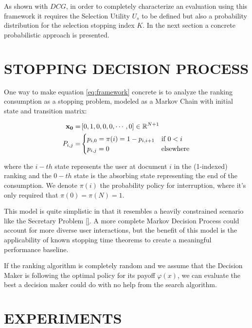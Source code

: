 \documentclass[a4paper, 10pt, conference]{ieeeconf}
\begin{document}
As shown with $DCG$, in order to completely characterize an evaluation using
this framework it requires the Selection Utility $U_s$ to be defined but also a
probability distribution for the selection stopping index $K$. In the next
section a concrete probabilistic approach is presented.


\section{STOPPING DECISION PROCESS}
\label{sec:stopping}

One way to make equation \ref{eq:framework} concrete is to analyze the ranking
consumption as a stopping problem, modeled as a Markov Chain with initial state
and transition matrix:

\begin{equation}
\begin{aligned}
\bf{x}_0 =& \left[0,1,0,0,0,\cdots,0\right] \in \mathbb{R}^{N+1}\\
P_{i,j} =& \begin{cases}
p_{i, 0} = \pi(i) = 1 - p_{i, i+1} &\text{if $0<i$}\\
p_{i,j} = 0 &\text{elsewhere}
\end{cases}
\end{aligned}
\end{equation}

where the $i-th$ state represents the user at document $i$ in the (1-indexed)
ranking and the $0-th$ state is the absorbing state representing the end of the
consumption. We denote $\pi(i)$ the probability policy for interruption, where
it's only required that $\pi(0) = \pi(N) = 1$.

This model is quite simplistic in that it resembles a heavily constrained
scenario like the Secretary Problem \ref{}. A more complete Markov Decision
Process could account for more diverse user interactions, but the benefit of
this model is the applicability of known stopping time theorems to create a
meaningful performance baseline.

If the ranking algorithm is completely random and we assume that the Decision
Maker is following the optimal policy for its payoff $\varphi(x)$, we can
evaluate the best a decision maker could do with no help from the search
algorithm.


\section{EXPERIMENTS}
\label{sec:experiments}
\end{document}
